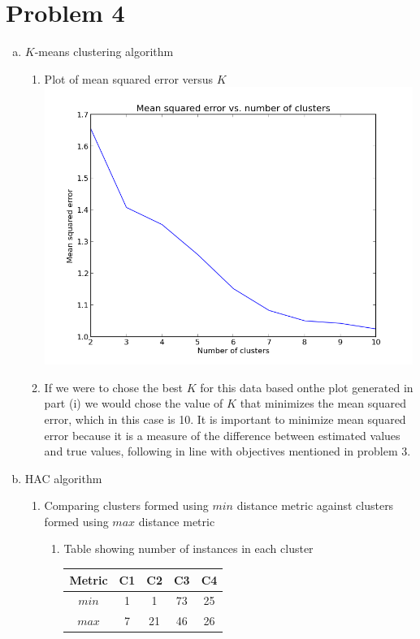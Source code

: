 \documentclass[11pt]{article}
\begin{document}
\section{Problem 4}
\begin{enumerate}[a.]
\item $K$-means clustering algorithm
\begin{enumerate}
\item Plot of mean squared error versus $K$\\
\includegraphics[width=120mm]{graphkmeans.png}
\item If we were to chose the best $K$ for this data based onthe plot generated in part (i) we would chose the value of $K$ that minimizes the mean squared error, which in this case is 10. It is important to minimize mean squared error because it is a measure of the difference between estimated values and true values, following in line with objectives mentioned in problem 3. 
\end{enumerate}
\item HAC algorithm
\begin{enumerate}
\item Comparing clusters formed using $min$ distance metric against clusters formed using $max$ distance metric
\begin{enumerate}
\item Table showing number of instances in each cluster\\
\begin{tabular}{|c|c|c|c|c|}
\hline
Metric & C1 & C2 & C3 & C4\\ \hline
$min$ & 1 & 1 & 73 & 25\\ \hline
$max$ & 7 & 21 & 46 & 26\\

\end{tabular}
\end{enumerate}
\end{enumerate}
\end{enumerate}
\end{document}
